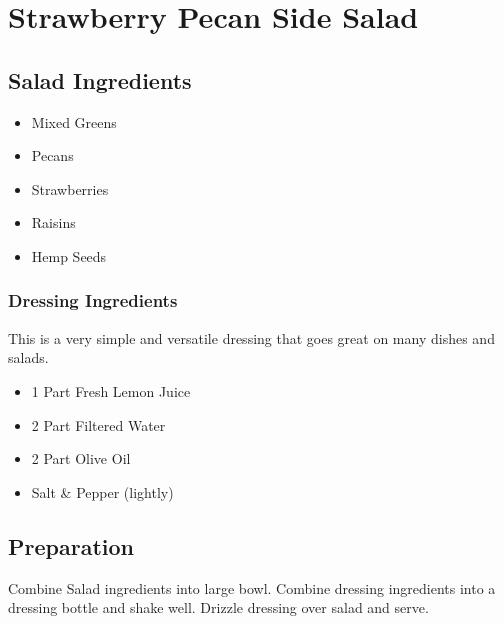 \thispagestyle{fancy}
\section{Strawberry Pecan Side Salad}
\AddToShipoutPicture*{\StrawberrySalad}

\subsection*{Salad Ingredients}

\begin{multicols}{3}
	\begin{itemize}
		\item Mixed Greens
		\item Pecans
		\item Strawberries
		\item Raisins
		\item Hemp Seeds
	\end{itemize}
\end{multicols}

\subsubsection*{Dressing Ingredients}
This is a very simple and versatile dressing that goes great on many dishes and salads.
\begin{multicols}{3}
	\begin{itemize}
		\item 1 Part Fresh Lemon Juice
		\item 2 Part Filtered Water
		\item 2 Part Olive Oil
		\item Salt \& Pepper (lightly)
	\end{itemize}
\end{multicols}

\subsection*{Preparation}

Combine Salad ingredients into large bowl. Combine dressing ingredients into a dressing bottle and shake well. Drizzle dressing over salad and serve.